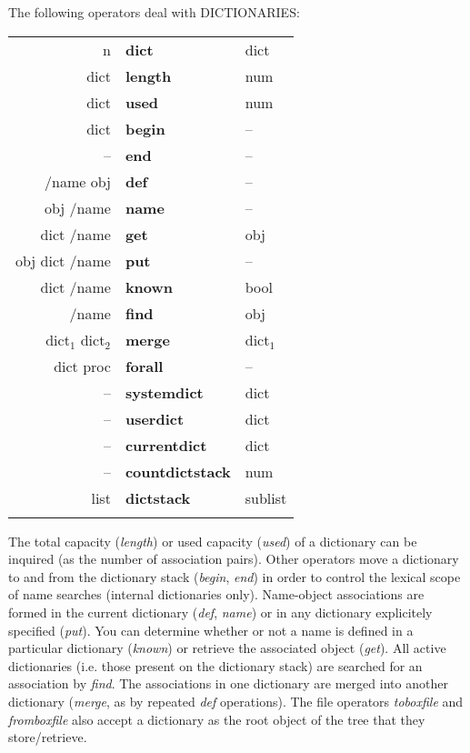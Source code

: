 \noindent The following operators deal with DICTIONARIES:
\nopagebreak \\

\begin{tabular}{>{\sffamily}r>{\sffamily\bfseries}l>{\sffamily}l}
n & dict & dict\\
dict & length & num\\
dict & used & num\\
dict & begin & --\\
-- & end & --\\
/name obj & def & --\\
obj /name & name & --\\
dict /name & get & obj\\
obj dict /name & put & --\\
dict /name & known & bool\\
/name & find & obj\\
dict$_1$ dict$_2$ & merge & dict$_1$\\
dict proc & forall & --\\
-- & systemdict & dict\\
-- & userdict & dict\\
-- & currentdict & dict\\
-- & countdictstack & num\\
list & dictstack & sublist\\\\
\end{tabular}

The  total capacity (\emph{length}) or used capacity (\emph{used}) of a dictionary  can be inquired (as the number of association pairs). Other operators move  a dictionary  to  and from the dictionary stack (\emph{begin}, \emph{end})  in  order  to control  the lexical scope of name searches (internal dictionaries  only). Name-object associations are formed in the current dictionary (\emph{def},  \emph{name}) or  in  any  dictionary  explicitely  specified  (\emph{put}).  You  can determine  whether  or  not a name is defined  in  a  particular dictionary (\emph{known}) or retrieve the associated object (\emph{get}). All active dictionaries (i.e. those present on the dictionary stack) are searched for an  association  by \emph{find}.  The associations in one dictionary are merged into another dictionary (\emph{merge}, as  by repeated \emph{def} operations). The file operators \emph{toboxfile} and \emph{fromboxfile} also accept a dictionary as the root object of the tree that they store/retrieve.

